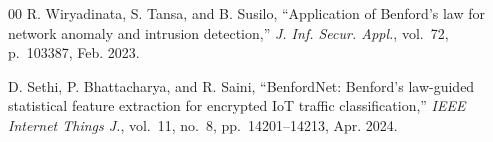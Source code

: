 \documentclass[conference]{IEEEtran}
\begin{document}
\begin{thebibliography}{00}
R. Wiryadinata, S. Tansa, and B. Susilo,
``Application of Benford's law for network anomaly and intrusion detection,''
\textit{J. Inf. Secur. Appl.}, vol.~72, p.~103387, Feb. 2023.

D. Sethi, P. Bhattacharya, and R. Saini,
``BenfordNet: Benford's law-guided statistical feature extraction for
encrypted IoT traffic classification,''
\textit{IEEE Internet Things J.}, vol.~11, no.~8, pp.~14201--14213,
Apr. 2024.

\end{thebibliography}

\vspace{12pt}
\end{document}
